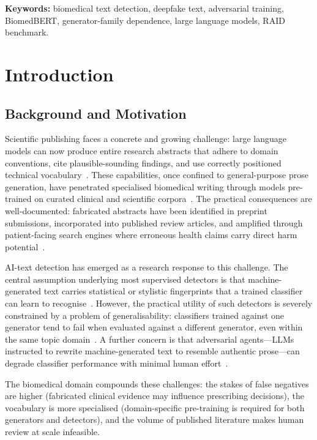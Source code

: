 \documentclass[12pt,a4paper]{article}
\begin{document}
\medskip
\noindent\textbf{Keywords:} biomedical text detection, deepfake text,
adversarial training, BiomedBERT, generator-family dependence,
large language models, RAID benchmark.

\newpage
\section{Introduction}

\subsection{Background and Motivation}

Scientific publishing faces a concrete and growing challenge: large language
models can now produce entire research abstracts that adhere to domain
conventions, cite plausible-sounding findings, and use correctly positioned
technical vocabulary~\cite{else2023chatgpt}. These capabilities, once
confined to general-purpose prose generation, have penetrated specialised
biomedical writing through models pre-trained on curated clinical and
scientific corpora~\cite{labrak2024biomistral}. The practical consequences
are well-documented: fabricated abstracts have been identified in preprint
submissions, incorporated into published review articles, and amplified
through patient-facing search engines where erroneous health claims carry
direct harm potential~\cite{majovsky2023artificialintelligence}.

AI-text detection has emerged as a research response to this challenge. The
central assumption underlying most supervised detectors is that
machine-generated text carries statistical or stylistic fingerprints that a
trained classifier can learn to recognise~\cite{solaiman2019releasestrategies,
gehrmann2019gltr}. However, the practical utility of such detectors is
severely constrained by a problem of generalisability: classifiers trained
against one generator tend to fail when evaluated against a different
generator, even within the same topic domain~\cite{dugan2024raid,li2024mage}.
A further concern is that adversarial agents—LLMs instructed to rewrite
machine-generated text to resemble authentic prose—can degrade classifier
performance with minimal human effort~\cite{krishna2023paraphrasing}.

The biomedical domain compounds these challenges: the stakes of false
negatives are higher (fabricated clinical evidence may influence prescribing
decisions), the vocabulary is more specialised (domain-specific pre-training
is required for both generators and detectors), and the volume of published
literature makes human review at scale infeasible.
\end{document}
